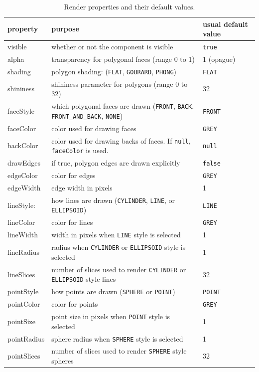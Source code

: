 \begin{table}
\begin{center}
\begin{tabular}{|lll|}
\hline property & purpose & usual default value \\ \hline
visible & whether or not the component is visible & {\tt true} \\
alpha & transparency for polygonal faces (range 0 to 1) & 1 (opague) \\
shading & polygon shading: ({\tt FLAT}, {\tt GOURARD}, {\tt PHONG}) & {\tt FLAT}\\
shininess & shininess parameter for polygons (range 0 to 32) & 32 \\
\hline
faceStyle &
which polygonal faces are drawn ({\tt FRONT}, {\tt BACK},
{\tt FRONT\_AND\_BACK}, {\tt NONE}) & {\tt FRONT} \\
faceColor &
color used for drawing faces & {\tt GREY} \\
backColor &
color used for drawing backs of faces. If {\tt null}, {\tt faceColor} is used. &
{\tt null} \\
drawEdges & if true, polygon edges are drawn explicitly & {\tt false} \\
\hline
edgeColor & color for edges & {\tt GREY} \\
edgeWidth & edge width in pixels & 1 \\
\hline
lineStyle: &
how lines are drawn ({\tt CYLINDER}, {\tt LINE}, or {\tt ELLIPSOID}) & 
{\tt LINE} \\
lineColor & color for lines & {\tt GREY} \\
lineWidth & width in pixels when {\tt LINE} style is selected & 1 \\
lineRadius & radius when {\tt CYLINDER} or {\tt ELLIPSOID} style is selected &
1 \\
lineSlices &
number of slices used to render {\tt CYLINDER} or {\tt ELLIPSOID} style lines &
32 \\
\hline
pointStyle & how points are drawn ({\tt SPHERE} or {\tt POINT}) & {\tt POINT} \\
pointColor & color for points & {\tt GREY} \\
pointSize & point size in pixels when {\tt POINT} style is selected & 1 \\
pointRadius & sphere radius when {\tt SPHERE} style is selected & 1 \\
pointSlices & number of slices used to render {\tt SPHERE} style spheres & 32 \\
\hline
\end{tabular}
\end{center}
\caption{Render properties and their default values.}
\label{RenderProps:tab}
\end{table}

